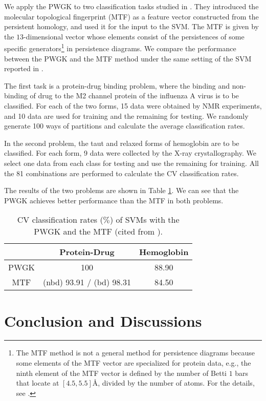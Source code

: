 \documentclass{article}
\begin{document}
We apply the PWGK to two classification tasks studied in \cite{CMWOXW15}.
They introduced the molecular topological fingerprint (MTF) as a feature vector constructed from the persistent homology, and used it for the input to the SVM.
The MTF is given by the $13$-dimensional vector whose elements consist of the persistences of some specific generators\footnote{The MTF method is not a general method for persistence diagrams because some elements of the MTF vector are specialized for protein data, e.g., the ninth element of the MTF vector is defined by the number of Betti $1$ bars that locate at $[4.5, 5.5]$\AA, divided by the number of atoms. For the details, see \cite{CMWOXW15}.} in persistence diagrams.
We compare the performance between the PWGK and the MTF method under the same setting of the SVM reported in \cite{CMWOXW15}.

The first task is a protein-drug binding problem, where the binding and non-binding of drug to the M2 channel protein of the influenza A virus is to be classified.
For each of the two forms, 15 data were obtained by NMR experiments, and 10 data are used for training and the remaining for testing.
We randomly generate 100 ways of partitions and calculate the average classification rates.

In the second problem, the taut and relaxed forms of hemoglobin are to be classified.
For each form, 9 data were collected by the X-ray crystallography.
We select one data from each class for testing and use the remaining  for training.
All the 81 combinations are performed to calculate the CV classification rates.

The results of the two problems are shown in Table \ref{table:Protein_results}.
We can see that the PWGK achieves better performance than the MTF in both problems.
\begin{table}[ttt]
\caption{CV classification rates ($\%$) of SVMs with the PWGK and the MTF (cited from \cite{CMWOXW15}).}
\label{table:Protein_results}
\centering
\begin{tabular}{c|c c}
\hline
& Protein-Drug  &  Hemoglobin \\ \hline
PWGK  &  100  & 88.90  \\
MTF  &  (nbd) 93.91 / (bd) 98.31 & 84.50 \\
\hline
\end{tabular}
\vspace{-3mm}
\end{table}


\section{Conclusion and Discussions}
\end{document}
